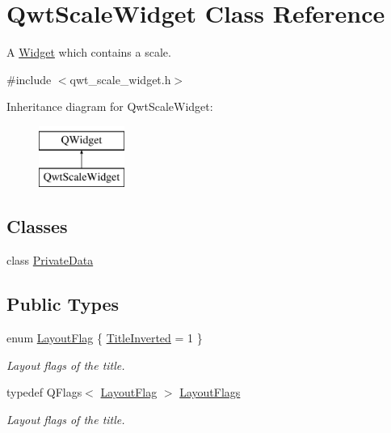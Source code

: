 \hypertarget{class_qwt_scale_widget}{\section{Qwt\-Scale\-Widget Class Reference}
\label{class_qwt_scale_widget}
}


A \hyperlink{class_widget}{Widget} which contains a scale.  




{\ttfamily \#include $<$qwt\-\_\-scale\-\_\-widget.\-h$>$}

Inheritance diagram for Qwt\-Scale\-Widget\-:\begin{figure}[H]
\begin{center}
\leavevmode
\includegraphics[height=2.000000cm]{class_qwt_scale_widget}
\end{center}
\end{figure}
\subsection*{Classes}
\begin{DoxyCompactItemize}
\item 
class \hyperlink{class_qwt_scale_widget_1_1_private_data}{Private\-Data}
\end{DoxyCompactItemize}
\subsection*{Public Types}
\begin{DoxyCompactItemize}
\item 
enum \hyperlink{class_qwt_scale_widget_a95903255246c9da84e7388b567354c8f}{Layout\-Flag} \{ \hyperlink{class_qwt_scale_widget_a95903255246c9da84e7388b567354c8fac6160b1d9f11f92db884ff26da8e2637}{Title\-Inverted} = 1
 \}
\begin{DoxyCompactList}\small\item\em Layout flags of the title. \end{DoxyCompactList}\item 
typedef Q\-Flags$<$ \hyperlink{class_qwt_scale_widget_a95903255246c9da84e7388b567354c8f}{Layout\-Flag} $>$ \hyperlink{class_qwt_scale_widget_a19dcd8adcfd10fe26e021fa47e22b843}{Layout\-Flags}
\begin{DoxyCompactList}\small\item\em Layout flags of the title. \end{DoxyCompactList}\end{DoxyCompactItemize}
